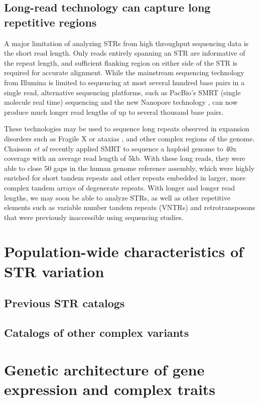 \subsection{Long-read technology can capture long repetitive regions}
A major limitation of analyzing STRs from high throughput sequencing data is the short read length. Only reads entirely spanning an STR are informative of the repeat length, and sufficient flanking region on either side of the STR is required for accurate alignment. While the mainstream sequencing technology from Illumina is limited to sequencing at most several hundred base pairs in a single read, alternative sequencing platforms, such as PacBio's SMRT (single molecule real time) sequencing \cite{EidFehrGrayEtAl2009} and the new Nanopore technology \cite{ClarkeWuJayasingheEtAl2009}, can now produce much longer read lengths of up to several thousand base pairs.

These technologies may be used to sequence long repeats observed in expansion disorders such as Fragile X \cite{LoomisEidPelusoEtAl2012} or ataxias \cite{DoiMonjoHoangEtAl2013}, and other complex regions of the genome. Chaisson \emph{et al} \cite{ChaissonHuddlestonDennisEtAl2015} recently applied SMRT to sequence a haploid genome to 40x coverage with an average read length of 5kb. With these long reads, they were able to close 50 gaps in the human genome reference assembly, which were highly enriched for short tandem repeats and other repeats embedded in larger, more complex tandem arrays of degenerate repeats. With longer and longer read lengths, we may soon be able to analyze STRs, as well as other repetitive elements such as variable number tandem repeats (VNTRs) and retrotransposons that were previously inaccessible using sequencing studies.

\section{Population-wide characteristics of STR variation}
\subsection{Previous STR catalogs}
\subsection{Catalogs of other complex variants}

\section{Genetic architecture of gene expression and complex traits}
\label{sec:introarch}
